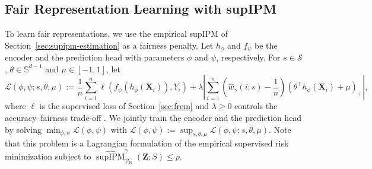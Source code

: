 \documentclass{article} %
\begin{document}
\subsection{Fair Representation Learning with supIPM}
\label{sec:supipm-objective}
To learn fair representations, we use the empirical supIPM of Section~\ref{sec:supipm-estimation} as a fairness penalty.
Let $h_{\phi}$ and $f_{\psi}$ be the encoder and the prediction head with parameters $\phi$ and $\psi$, respectively.
For $s\in\mathcal{S}$, $\theta\in\mathbb{S}^{d-1}$ and $\mu\in[-1,1]$, let
\begin{equation}
  \mathcal{L}(\phi,\psi;s,\theta,\mu)
  :=\frac{1}{n}\sum_{i=1}^n
  \ell\!\left(f_{\psi}(h_{\phi}(\mathbf{X}_i)),Y_i\right)
  +\lambda\left|
    \sum_{i=1}^n
    \left(\widehat{w}_{\gamma}(i;s)-\frac{1}{n}\right)
    (\theta^\top h_{\phi}(\mathbf{X}_i)+\mu)_+
  \right|,
  \label{eq:supipm-penalized-objective}
\end{equation}
where $\ell$ is the supervised loss of Section~\ref{sec:frem} and $\lambda\ge0$ controls the accuracy--fairness trade-off \citep{zhao2022inherent}.  
We jointly train the encoder and the prediction head by solving $\min_{\phi,\psi}\mathcal{L}(\phi,\psi)$ with $\mathcal{L}(\phi,\psi):=\sup_{s,\theta,\mu}\mathcal{L}(\phi,\psi;s,\theta,\mu)$.
Note that this problem is a Lagrangian formulation of  the empirical supervised risk minimization subject to $\widehat{\operatorname{supIPM}}^{\gamma}_{\mathcal{V}_{\mathrm{R}}}(\mathbf{Z};S)\le\rho$.
\end{document}
